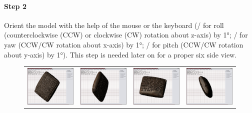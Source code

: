 \paragraph*{Step 2}
Orient the model with the help of the mouse or the keyboard (/ for roll (counterclockwise (CCW) or clockwise (CW) rotation about z-axis) by 1°; / for yaw (CCW/CW rotation about x-axis) by 1°; / for pitch (CCW/CW rotation about y-axis) by 1°). This step is needed later on for a proper six side view.

\begin{figure}[H]
 \centering
 \begin{tabular}{cccc}
  \includegraphics[width=3cm]{figs/not_oriented_01} & \includegraphics[width=3cm]{figs/not_oriented_02} & \includegraphics[width=3cm]{figs/not_oriented_03} & \includegraphics[width=3cm]{figs/not_oriented_04} \\

\end{tabular}
\end{figure}
